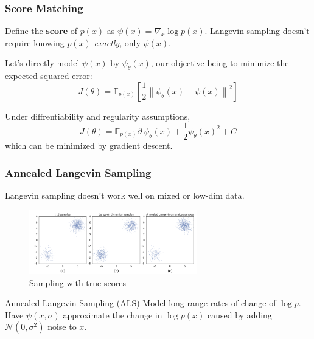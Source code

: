 \documentclass{beamer}
\begin{document}
\begin{frame}
    \frametitle{Score Matching}
    Define the \textbf{score} of $p(x)$ as $\psi(x) = \nabla_x \log p(x)$. Langevin sampling doesn't require knowing $p(x)$ \textit{exactly}, only $\psi(x)$.

    Let's directly model $\psi(x)$ by $\psi_\theta(x)$, our objective being to minimize the expected squared error:
    \[J(\theta) = \mathbb{E}_{p(x)} \left[ \frac{1}{2} \left\| \psi_\theta(x) - \psi(x) \right\|^2 \right]\]

    Under diffrentiability and regularity assumptions,
    \[J(\theta) = \mathbb{E}_{p(x)} \partial \ \psi_\theta(x) + \frac{1}{2} \psi_\theta(x)^2 + C\]
    which can be minimized by gradient descent.
\end{frame}

\begin{frame}
    \frametitle{Annealed Langevin Sampling}
    Langevin sampling doesn't work well on mixed or low-dim data.
    
    \begin{figure}
        \centering
        \includegraphics[width=0.65\textwidth]{images/langevin.png}
        \caption[]{Sampling with true scores}
        \label{fig:als}
    \end{figure}

    \begin{block}{Annealed Langevin Sampling (ALS)}
        Model long-range rates of change of $\log p$. Have $\psi(x, \sigma)$ approximate the change in $\log p(x)$ caused by adding $\mathcal{N}(0, \sigma^2)$ noise to $x$.
    \end{block}
\end{frame}
\end{document}
